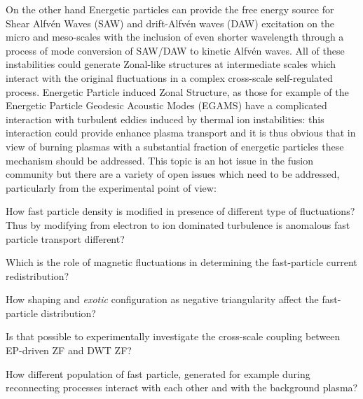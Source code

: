\documentclass[12pt,a4paper]{article}
\begin{document}
On the other hand Energetic
particles can provide the free energy source for Shear Alfv{\'e}n
Waves (SAW) and drift-Alfv{\'e}n waves (DAW) excitation on the micro and
meso-scales \cite{Zonca:2015hs} with the inclusion of even shorter
wavelength through a process of mode conversion of SAW/DAW to kinetic
Alfv{\'e}n waves. All of these instabilities could generate Zonal-like
structures at intermediate scales which interact with the original
fluctuations in a complex cross-scale self-regulated process. 
Energetic Particle induced Zonal Structure, as those for
example of the Energetic Particle Geodesic Acoustic Modes (EGAMS)
\cite{Zarzoso:2013kw,Nazikian:2008hk,Ido:2011gy} have a complicated
interaction with turbulent eddies induced by thermal ion
instabilities: this interaction could provide enhance plasma transport
and it is thus obvious that in view of burning plasmas with a
substantial fraction of energetic particles these mechanism should be
addressed. This topic is an hot issue in the fusion community but
there are a variety of open issues which need to be addressed,
particularly from the experimental point of view:
\begin{description}[labelindent=0pt, labelsep*=0.3em, leftmargin=!, itemsep=0.02ex]
\item[(i)] How fast particle density is modified in presence of
  different type of fluctuations? Thus by modifying from electron to
  ion dominated turbulence is anomalous fast particle transport different?
\item[(ii)] Which is the role of magnetic fluctuations in determining
  the fast-particle current redistribution?
\item[(iii)] How shaping and \emph{exotic} configuration as negative
  triangularity affect the fast-particle distribution?
\item[(iv)] Is that possible to experimentally investigate the
  cross-scale coupling between EP-driven ZF and DWT ZF?
\item[(v)] How different population of fast particle, generated for
  example during reconnecting processes interact with each other and
  with the background plasma?
\end{description}
\end{document}
